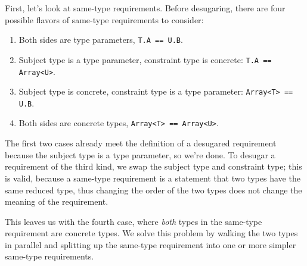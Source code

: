\documentclass[../generics]{subfiles}
\begin{document}
First, let's look at same-type requirements. Before desugaring, there are four possible flavors of same-type requirements to consider:
\begin{enumerate}
\item Both sides are type parameters, \verb|T.A == U.B|.
\item Subject type is a type parameter, constraint type is concrete: \verb|T.A == Array<U>|.
\item Subject type is concrete, constraint type is a type parameter: \verb|Array<T> == U.B|.
\item Both sides are concrete types, \verb|Array<T> == Array<U>|.
\end{enumerate}
The first two cases already meet the definition of a desugared requirement because the subject type is a type parameter, so we're done. To desugar a requirement of the third kind, we swap the subject type and constraint type; this is valid, because a same-type requirement is a statement that two types have the same reduced type, thus changing the order of the two types does not change the meaning of the requirement.

This leaves us with the fourth case, where \emph{both} types in the same-type requirement are concrete types. We solve this problem by walking the two types in parallel and splitting up the same-type requirement into one or more simpler same-type requirements.
\end{document}
